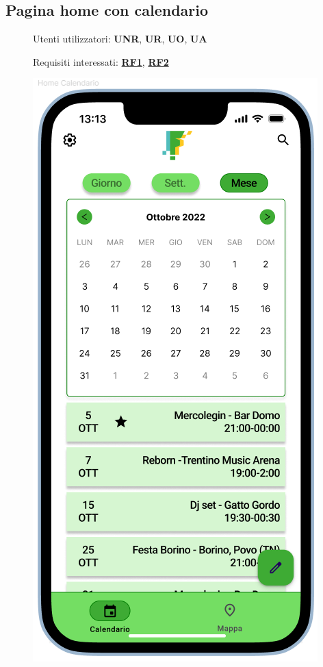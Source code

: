 \documentclass{article}
\begin{document}
\subsection{Pagina home con calendario}
\begin{description}
    \item[] Utenti utilizzatori: \textbf{UNR}, \textbf{UR}, \textbf{UO}, \textbf{UA}
    \item[] Requisiti interessati: \hyperref[rf_1]{\textbf{RF1}}, \hyperref[rf_2]{\textbf{RF2}}
    \item[] \begin{center}
            \includegraphics[scale=0.6]{Home_Calendario.png}

\end{center}
\end{description}
\end{document}
